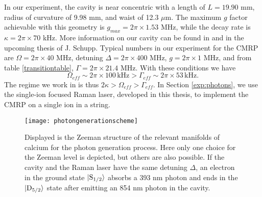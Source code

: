 In our experiment, the cavity is near concentric with a length of $L = 19.90$ mm, radius of curvature of 9.98 mm, and waist of 12.3 $\mu$m. The maximum $g$ factor achievable with this geometry is $g_{max} = 2\pi \times 1.53$ MHz, while the decay rate is $\kappa = 2\pi\times 70$ kHz. More information on our cavity can be found in \cite{Krutyanskiy2019} and in the upcoming thesis of J. Schupp. Typical numbers in our experiment for the CMRP are $\Omega =  2\pi\times 40$ MHz, detuning $\Delta = 2\pi\times 400$ MHz, $g = 2\pi\times 1$ MHz, and from table \ref{transitiontable}, $\Gamma = 2\pi \times 21.4$ MHz. With these conditions we have
\[\Omega_{eff} \sim 2\pi\times 100\, \text{kHz} > \Gamma_{eff} \sim 2\pi\times 53\,\text{kHz}.\]
The regime we work in is thus $2\kappa>\Omega_{eff}>\Gamma_{eff}$. In Section \ref{exp:photons}, we use the single-ion focused Raman laser, developed in this thesis, to implement the CMRP on a single ion in a string.
\begin{figure}
     \centering
     \texttt{[image: photongenerationscheme]}
    \caption{Displayed is the Zeeman structure of the relevant manifolds of calcium for the photon generation process. Here only one choice for the Zeeman level is depicted, but others are also possible. If the cavity and the Raman laser have the same detuning $\Delta$, an electron in the ground state $\ket{\text{S}_{1/2}}$ absorbs a 393 nm photon and ends in the $\ket{\text{D}_{5/2}}$ state after emitting an 854 nm photon in the cavity.}
      \label{ramanprocess}
\end{figure}



